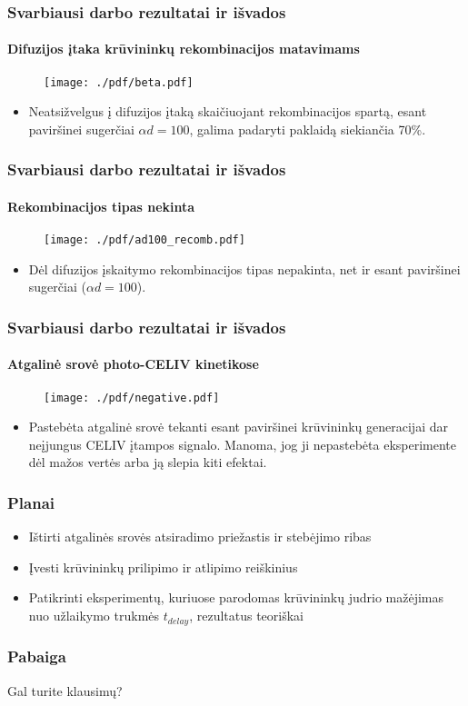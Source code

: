 \documentclass{beamer}
\begin{document}
  \begin{frame}
    \frametitle{Svarbiausi darbo rezultatai ir išvados}
    \framesubtitle{Difuzijos įtaka krūvininkų rekombinacijos matavimams}
    \begin{figure}
    	\texttt{[image: ./pdf/beta.pdf]}
    \end{figure}
    \begin{itemize}
      \item Neatsižvelgus į difuzijos įtaką skaičiuojant rekombinacijos spartą, esant paviršinei sugerčiai \(\alpha d = 100\), galima padaryti paklaidą siekiančia 70\%.
    \end{itemize}
  \end{frame}
  
  \begin{frame}
    \frametitle{Svarbiausi darbo rezultatai ir išvados}
    \framesubtitle{Rekombinacijos tipas nekinta}
    \begin{figure}
    	\texttt{[image: ./pdf/ad100\_recomb.pdf]}
    \end{figure}
    \begin{itemize}
      \item Dėl difuzijos įskaitymo rekombinacijos tipas nepakinta, net ir esant paviršinei sugerčiai (\(\alpha d = 100\)).
    \end{itemize}
  \end{frame}
  
  \begin{frame}
    \frametitle{Svarbiausi darbo rezultatai ir išvados}
    \framesubtitle{Atgalinė srovė photo-CELIV kinetikose}
    \begin{figure}
    	\texttt{[image: ./pdf/negative.pdf]}
    \end{figure}
    \begin{itemize}
      \item Pastebėta atgalinė srovė tekanti esant paviršinei krūvininkų generacijai dar neįjungus CELIV įtampos signalo. Manoma, jog ji nepastebėta eksperimente dėl mažos vertės arba ją slepia kiti efektai.
    \end{itemize}
  \end{frame}
  
    \begin{frame}
    \frametitle{Planai}
    \begin{itemize}
      \item Ištirti atgalinės srovės atsiradimo priežastis ir stebėjimo ribas
      \item Įvesti krūvininkų prilipimo ir atlipimo reiškinius
      \item Patikrinti eksperimentų, kuriuose parodomas krūvininkų judrio mažėjimas nuo užlaikymo trukmės \(t_{delay}\), rezultatus teoriškai
    \end{itemize}
  \end{frame}
  
  \begin{frame}
  \frametitle{Pabaiga}
  Gal turite klausimų?
  \end{frame}
  
\end{document}
